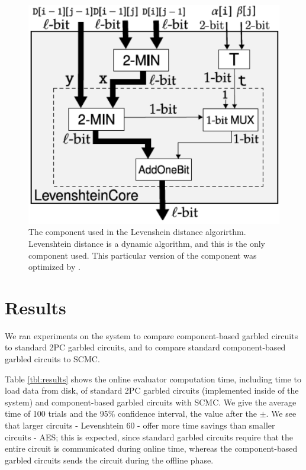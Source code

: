 \begin{figure}
    \center
    \includegraphics[scale=0.3]{leven_core}
    \caption{The component used in the Levenshein distance algorirthm. 
    Levenshtein distance is a dynamic algorithm, and this is the only component used. 
    This particular version of the component was optimized by \cite{faster2pc}.}
    \label{fig:leven-core}
\end{figure}

\section{Results}


We ran experiments on the \CompGC system to compare component-based garbled circuits to standard 2PC garbled circuits, and to compare standard component-based garbled circuits to SCMC.

Table \ref{tbl:results} shows the online evaluator computation time, including time to load data from disk, of standard 2PC garbled circuits (implemented inside of the \CompGC system) and component-based garbled circuits with SCMC.
We give the average time of 100 trials and the 95\% confidence interval, the value after the $\pm$.
We see that larger circuits - Levenshtein 60 - offer more time savings than smaller circuits - AES; this is expected, since standard garbled circuits require that the entire circuit is communicated during online time, whereas the component-based garbled circuits sends the circuit during the offline phase. 

